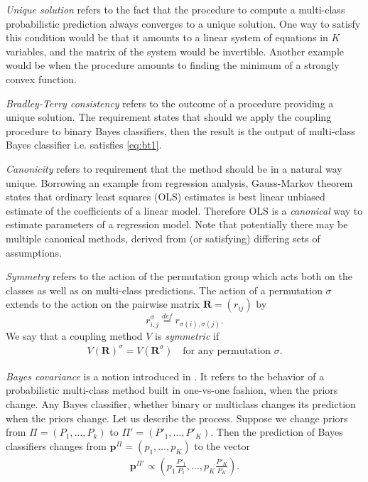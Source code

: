 \documentclass[twoside,11pt]{article}
\begin{document}
\emph{Unique solution} refers to the fact that the procedure to compute a multi-class probabilistic prediction always converges to a unique solution. One way to satisfy this condition would be that it amounts to a linear system of equations in $K$ variables, and the matrix of the system would be invertible. Another example would be when the procedure amounts to finding the minimum of a strongly convex function. 

\emph{Bradley-Terry consistency} refers to the outcome of a procedure providing a unique solution. The requirement states that should we apply the coupling procedure to binary Bayes classifiers, then the result is the output of multi-class Bayes classifier i.e. satisfies \eqref{eq:bt1}.

\emph{Canonicity} refers to requirement that the method should be in a natural way unique. Borrowing an example from regression analysis, Gauss-Markov theorem states that ordinary least squares (OLS) estimates is best linear unbiased estimate of the coefficients of a linear model. Therefore OLS  is a \emph{canonical} way to estimate parameters of a regression model. Note that potentially there may be multiple canonical methods, derived from (or satisfying) differing sets of assumptions. 

\emph{Symmetry} refers to the action of the permutation group which acts both on the classes as well as on multi-class predictions. The action of a permutation $\sigma$ extends to the action on the pairwise matrix $\boldsymbol{R} = (r_{ij})$ by 
\begin{equation}
	 r^\sigma_{i,j} \stackrel{def}{=}  r_{\sigma(i), \sigma(j)}.
\end{equation}
We say that a coupling method $V$ is \emph{symmetric} if 
\begin{align}
		V(\boldsymbol{R})^\sigma = V(\boldsymbol{R}^\sigma)\quad\textrm{for any permutation $\sigma$}.
\end{align}

\emph{Bayes covariance} is a notion introduced in  \cite{vsuch2016bayes}. It refers to the behavior of a probabilistic multi-class method built in one-vs-one fashion, when the priors change. Any Bayes classifier, whether binary or multiclass changes its prediction when the priors change. Let us describe the process. Suppose we change priors from $\Pi = (P_1, \ldots, P_k)$ to $\Pi'= (P'_1, \ldots, P'_K)$. Then the prediction of Bayes classifiers changes from $\boldsymbol{p}^\Pi= (p_1, \ldots, p_K)$ to the vector 
\begin{align}
\boldsymbol{p}^{\Pi'} \propto (p_1 \frac{P'_1}{P_1}, \ldots, p_K \frac{P'_K}{P_K}). \label{eq:changePrior}
\end{align}
\end{document}
